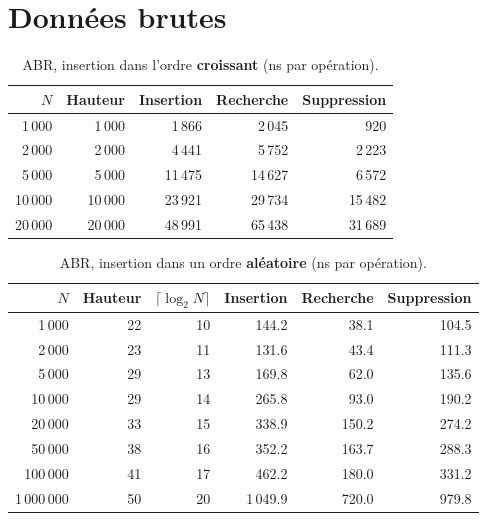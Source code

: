\documentclass[12pt,a4paper]{report}
\begin{document}
\section{Données brutes}
\begin{table}[H]
\centering
\caption{ABR, insertion dans l'ordre \textbf{croissant} (ns par opération).}
\begin{tabular}{rrrrr}
  \toprule
  $N$ & Hauteur & Insertion & Recherche & Suppression \\
  \midrule
  1\,000  & 1\,000  & 1\,866  & 2\,045  & 920 \\
  2\,000  & 2\,000  & 4\,441  & 5\,752  & 2\,223 \\
  5\,000  & 5\,000  & 11\,475 & 14\,627 & 6\,572 \\
  10\,000 & 10\,000 & 23\,921 & 29\,734 & 15\,482 \\
  20\,000 & 20\,000 & 48\,991 & 65\,438 & 31\,689 \\
  \bottomrule
\end{tabular}
\end{table}

\begin{table}[H]
\centering
\caption{ABR, insertion dans un ordre \textbf{aléatoire} (ns par opération).}
\begin{tabular}{rrrrrr}
  \toprule
  $N$ & Hauteur & $\lceil\log_2 N\rceil$ & Insertion & Recherche & Suppression \\
  \midrule
  1\,000     & 22 & 10 & 144.2  & 38.1  & 104.5 \\
  2\,000     & 23 & 11 & 131.6  & 43.4  & 111.3 \\
  5\,000     & 29 & 13 & 169.8  & 62.0  & 135.6 \\
  10\,000    & 29 & 14 & 265.8  & 93.0  & 190.2 \\
  20\,000    & 33 & 15 & 338.9  & 150.2 & 274.2 \\
  50\,000    & 38 & 16 & 352.2  & 163.7 & 288.3 \\
  100\,000   & 41 & 17 & 462.2  & 180.0 & 331.2 \\
  1\,000\,000 & 50 & 20 & 1\,049.9 & 720.0 & 979.8 \\
  \bottomrule
\end{tabular}
\end{table}
\end{document}
